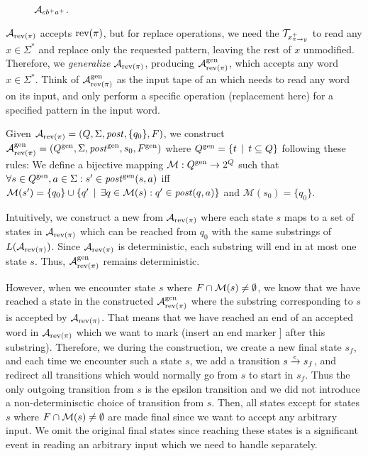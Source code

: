 \begin{figure}[ht]
  \centering
  \caption{\dfa $\mathcal{A}_{cb^+a^+}$.}
  \label{fig:end_marker_dfa}
\end{figure}

$\mathcal{A}_{\text{rev(}\pi\text{)}}$ accepts $\text{rev(}\pi\text{)}$, but for replace operations, we need the $\mathcal{T}_{x^{+}_{\pi \rightarrow y}}$ to read any $x \in \Sigma^*$ and replace only the requested pattern, leaving the rest of $x$ unmodified.
Therefore, we \emph{generalize} $\mathcal{A}_{\text{rev(}\pi\text{)}}$, producing $\mathcal{A}^{\text{gen}}_{\text{rev(}\pi\text{)}}$, which accepts any word $x \in \Sigma^*$.
Think of $\mathcal{A}^{\text{gen}}_{\text{rev(}\pi\text{)}}$ as the input tape of an \nft which needs to read any word on its input, and only perform a specific operation (replacement here) for a specified pattern in the input word.

Given $\mathcal{A}_{\text{rev(}\pi\text{)}} = (Q, \Sigma, \mathit{post}, \{ q_0 \}, F)$, we construct $\mathcal{A}^{\text{gen}}_{\text{rev(}\pi\text{)}} = (Q^{\text{gen}}, \Sigma, \mathit{post}^{\text{gen}}, { s_0 }, F^{\text{gen}})$ where $Q^{\text{gen}} = \{ t \,\mid\, t \subseteq Q \}$ following these rules:\newline
We define a bijective mapping $\mathcal{M}: Q^{\text{gen}} \rightarrow 2^{Q }$ such that $\forall s \in Q^{\text{gen}}, a \in \Sigma: s' \in \mathit{post}^{\text{gen}}(s, a)$
iff $\mathcal{M}(s') = \{ q_0 \} \cup \{ q' \,\mid\, \exists q \in \mathcal{M}(s): q' \in \mathit{post}(q, a) \}$
and $\mathcal{M}(s_0) = \{ q_0 \}$.

Intuitively, we construct a new \dfa from $\mathcal{A}_{\text{rev(}\pi\text{)}}$ where each state $s$ maps to a set of states in $\mathcal{A}_{\text{rev(}\pi\text{)}}$ which can be reached from $q_0$ with the same substrings of $L(\mathcal{A}_{\text{rev(}\pi\text{)}})$.
Since $\mathcal{A}_{\text{rev(}\pi\text{)}}$ is deterministic, each substring will end in at most one state $s$.
Thus, $\mathcal{A}^{\text{gen}}_{\text{rev(}\pi\text{)}}$ remains deterministic.

However, when we encounter state $s$ where $F \cap \mathcal{M}(s) \neq \emptyset$, we know that we have reached a state in the constructed $\mathcal{A}^{\text{gen}}_{\text{rev(}\pi\text{)}}$ where the substring corresponding to $s$ is accepted by $\mathcal{A}_{\text{rev(}\pi\text{)}}$.
That means that we have reached an end of an accepted word in $\mathcal{A}_{\text{rev(}\pi\text{)}}$ which we want to mark (insert an end marker $]$ after this substring).
Therefore, we during the construction, we create a new final state $s_f$, and each time we encounter such a state $s$, we add a transition ${s} \xrightarrow{{\epsilon}} {s_f}$, and redirect all transitions which would normally go from $s$ to start in $s_f$.
Thus the only outgoing transition from $s$ is the epsilon transition and we did not introduce a non-determinisctic choice of transition from $s$.
Then, all states except for states $s$ where $F \cap \mathcal{M}(s) \neq \emptyset$ are made final since we want to accept any arbitrary input.
We omit the original final states since reaching these states is a significant event in reading an arbitrary input which we need to handle separately.

